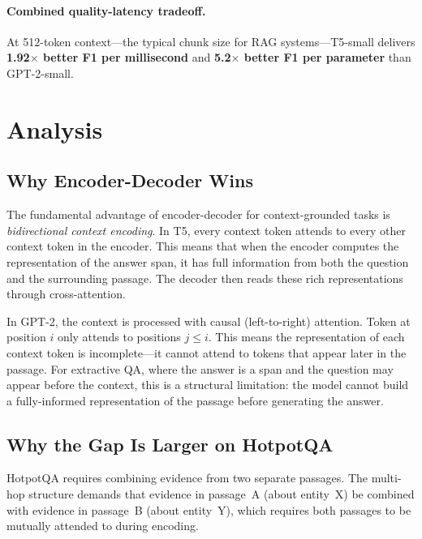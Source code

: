 \documentclass[11pt]{article}
\newcommand{\hotpotqa}{HotpotQA\xspace}
\begin{document}
\paragraph{Combined quality-latency tradeoff.}
At 512-token context---the typical chunk size for RAG systems---T5-small delivers
\textbf{1.92$\times$ better F1 per millisecond} and \textbf{5.2$\times$ better F1
per parameter} than GPT-2-small.

\section{Analysis}

\subsection{Why Encoder-Decoder Wins}

The fundamental advantage of encoder-decoder for context-grounded tasks is
\emph{bidirectional context encoding}.
In T5, every context token attends to every other context token in the encoder.
This means that when the encoder computes the representation of the answer span,
it has full information from both the question and the surrounding passage.
The decoder then reads these rich representations through cross-attention.

In GPT-2, the context is processed with causal (left-to-right) attention.
Token at position $i$ only attends to positions $j \leq i$.
This means the representation of each context token is incomplete---it cannot
attend to tokens that appear later in the passage.
For extractive QA, where the answer is a span and the question may appear before
the context, this is a structural limitation: the model cannot build a
fully-informed representation of the passage before generating the answer.

\subsection{Why the Gap Is Larger on HotpotQA}

\hotpotqa requires combining evidence from two separate passages.
The multi-hop structure demands that evidence in passage~A (about entity~X)
be combined with evidence in passage~B (about entity~Y), which requires both
passages to be mutually attended to during encoding.
\end{document}
